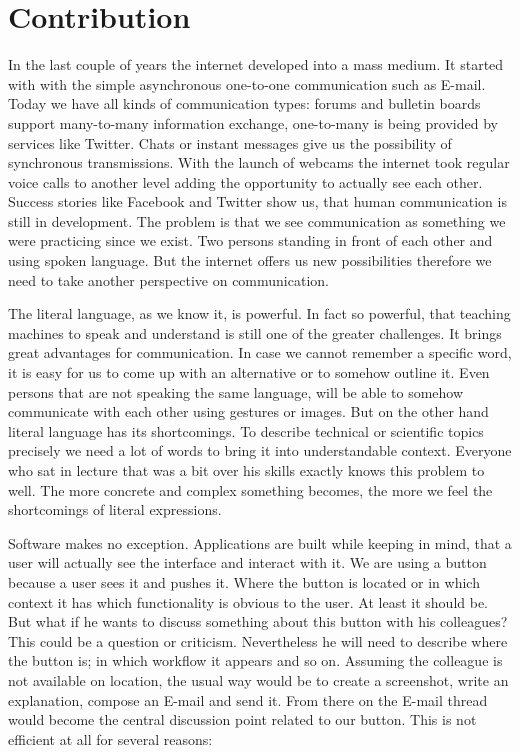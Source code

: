 \section{Contribution}\label{contribution}

In the last couple of years the internet developed into a mass medium. It started with with the simple asynchronous one-to-one communication such as E-mail. Today we have all kinds of communication types: forums and bulletin boards support many-to-many information exchange, one-to-many is being provided by services like Twitter. Chats or instant messages give us the possibility of synchronous transmissions. With the launch of webcams the internet took regular voice calls to another level adding the opportunity to actually see each other. Success stories like Facebook and Twitter show us, that human communication is still in development. The problem is that we see communication as something we were practicing since we exist. Two persons standing in front of each other and using spoken language. But the internet offers us new possibilities therefore we need to take another perspective on communication. 

The literal language, as we know it, is powerful. In fact so powerful, that teaching machines to speak and understand is still one of the greater challenges. It brings great advantages for communication. In case we cannot remember a specific word, it is easy for us to come up with an alternative or to somehow outline it. Even persons that are not speaking the same language, will be able to somehow communicate with each other using gestures or images. But on the other hand literal language has its shortcomings. To describe technical or scientific topics precisely we need a lot of words to bring it into understandable context. Everyone who sat in lecture that was a bit over his skills exactly knows this problem to well. The more concrete and complex something becomes, the more we feel the shortcomings of literal expressions. 

Software makes no exception. Applications are built while keeping in mind, that a user will actually see the interface and interact with it. We are using a button because a user sees it and pushes it. Where the button is located or in which context it has which functionality is obvious to the user. At least it should be. But what if he wants to discuss something about this button with his colleagues? This could be a question or criticism. Nevertheless he will need to describe where the button is; in which workflow it appears and so on. Assuming the colleague is not available on location, the usual way would be to create a screenshot, write an explanation, compose an E-mail and send it. From there on the E-mail thread would become the central discussion point related to our button. This is not efficient at all for several reasons:


